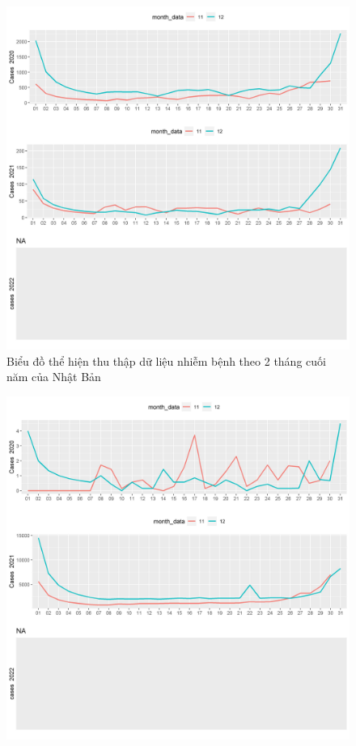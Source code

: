 \documentclass[a4paper]{article}
\theoremstyle{definition}
\begin{document}
\begin{enumerate}[i)]
\begin{enumerate}[1)]
\begin{figure}[htp]
		    \includegraphics[scale = 0.7]{Images/VI/vi4 Japan .jpeg}
		    \caption{Biểu đồ thể hiện thu thập dữ liệu nhiễm bệnh theo 2 tháng cuối năm của Nhật Bản}
		    \label{fig:my_label}
		\end{figure}
		\begin{figure}[htp]
		    \centering
		    \includegraphics[scale = 0.7]{Images/VI/vi4 Vietnam .jpeg} 

\end{figure}
\end{enumerate}
\end{enumerate}
\end{document}
